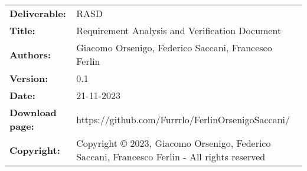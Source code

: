 \documentclass{config/PoliMi3i_thesis}
\begin{document}


\pagestyle{empty} %
\frontmatter %


\renewcommand{\headrulewidth}{0pt} %
\begin{table}[h!]
    \begin{tabu} to \textwidth { X[0.3,r,p] X[0.7,l,p] }
        \hline

        \textbf{Deliverable:}   & RASD                                                                                           \\
        \textbf{Title:}         & Requirement Analysis and Verification Document                                                 \\
        \textbf{Authors:}       & Giacomo Orsenigo, Federico Saccani, Francesco Ferlin                                           \\
        \textbf{Version:}       & 0.1                                                                                            \\
        \textbf{Date:}          & 21{-}11{-}2023                                                                                 \\
        \textbf{Download page:} & https://github.com/Furrrlo/FerlinOrsenigoSaccani/                                              \\
        \textbf{Copyright:}     & Copyright © 2023, Giacomo Orsenigo, Federico Saccani, Francesco Ferlin {-} All rights reserved \\
        \hline
    \end{tabu}
\end{table}
\end{document}
